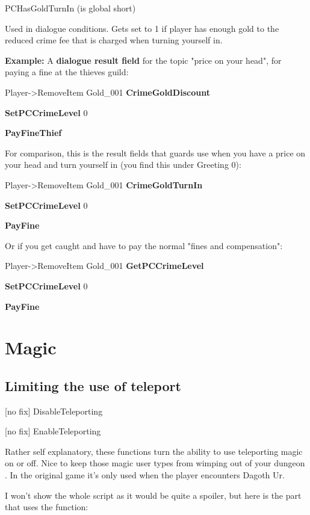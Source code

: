 \documentclass[
]{article}
\begin{document}
PCHasGoldTurnIn (is global short)

Used in dialogue conditions. Gets set to 1 if player has enough gold to
the reduced crime fee that is charged when turning yourself in.

\textbf{Example:} A \textbf{dialogue result field} for the topic "price
on your head", for paying a fine at the thieves guild:

Player-\textgreater RemoveItem Gold\_001 \textbf{CrimeGoldDiscount}

\textbf{SetPCCrimeLevel} 0

\textbf{PayFineThief}

For comparison, this is the result fields that guards use when you have
a price on your head and turn yourself in (you find this under Greeting
0):

Player-\textgreater RemoveItem Gold\_001 \textbf{CrimeGoldTurnIn}

\textbf{SetPCCrimeLevel} 0

\textbf{PayFine}

Or if you get caught and have to pay the normal "fines and
compensation":

Player-\textgreater RemoveItem Gold\_001 \textbf{GetPCCrimeLevel}

\textbf{SetPCCrimeLevel} 0

\textbf{PayFine}

\hypertarget{magic}{%
\section{\texorpdfstring{\hfill\break
Magic}{ Magic}}\label{magic}}

\hypertarget{limiting-the-use-of-teleport}{%
\subsection{Limiting the use of
teleport}\label{limiting-the-use-of-teleport}}

{[}no fix{]} DisableTeleporting

{[}no fix{]} EnableTeleporting

Rather self explanatory, these functions turn the ability to use
teleporting magic on or off. Nice to keep those magic user types from
wimping out of your dungeon . In the original game it's only used when
the player encounters Dagoth Ur.

I won't show the whole script as it would be quite a spoiler, but here
is the part that uses the function:
\end{document}
